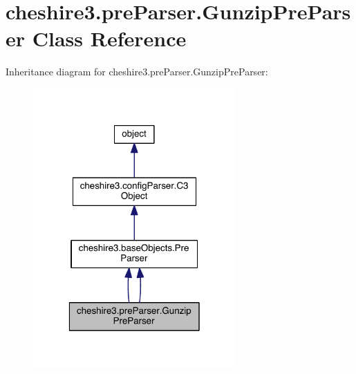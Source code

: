 \hypertarget{classcheshire3_1_1pre_parser_1_1_gunzip_pre_parser}{\section{cheshire3.\-pre\-Parser.\-Gunzip\-Pre\-Parser Class Reference}
\label{classcheshire3_1_1pre_parser_1_1_gunzip_pre_parser}
}


Inheritance diagram for cheshire3.\-pre\-Parser.\-Gunzip\-Pre\-Parser\-:
\nopagebreak
\begin{figure}[H]
\begin{center}
\leavevmode
\includegraphics[width=220pt]{classcheshire3_1_1pre_parser_1_1_gunzip_pre_parser__inherit__graph}
\end{center}
\end{figure}


